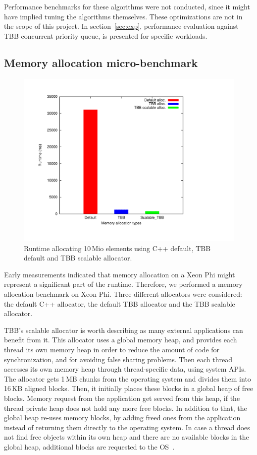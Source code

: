 Performance benchmarks for these algorithms were not conducted, since it might have implied tuning the algorithms themselves.
These optimizations are not in the scope of this project.
In section~\ref{sec:exp}, performance evaluation against TBB concurrent priority queue, is presented for specific workloads.

\subsection{Memory allocation micro-benchmark}
\begin{figure}[t]
	\centering
	\includegraphics[scale=0.3]{../plots/mem_alloc/mem_alloc.pdf}
	\caption{Runtime allocating 10\,Mio elements using C++ default, TBB default and TBB scalable allocator.}
	\label{fig:mem_alloc}
\end{figure}

Early measurements indicated that memory allocation on a Xeon Phi might represent a significant part of the runtime.
Therefore, we performed a memory allocation benchmark on Xeon Phi.
Three different allocators were considered: the default C++ allocator, the default TBB allocator and the TBB scalable allocator. 

TBB's scalable allocator is worth describing as many external applications can benefit from it.
This allocator uses a global memory heap, and provides each thread its own memory heap in order to reduce the amount of code for synchronization, and for avoiding false sharing problems. Then each thread accesses its own memory heap through thread-specific data, using system APIs. The allocator gets 1\,MB chunks from the operating system and divides them into 16\,KB aligned blocks. Then, it initially places these blocks in a global heap of free blocks. Memory request from the application get served from this heap, if the thread private heap does not hold any more free blocks.
In addition to that, the global heap re-uses memory blocks, by adding freed ones from the application instead of returning them directly to the operating system.
In case a thread does not find free objects within its own heap and there are no available blocks in the global heap, additional blocks are requested to the OS~\cite{_thefoundations,Hudson:2006:MST:1133956.1133967}. 

